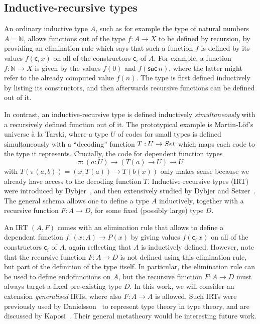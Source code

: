 \documentclass[a4paper,UKenglish,numberwithinsect,cleveref,thm-restate]{lipics-v2021}
\begin{document}
\subsection{Inductive-recursive types}

An ordinary inductive type $A$, such as for example the type of natural numbers $A = \mathbb{N}$, allows functions out of the type $f : A \to X$ to be defined by recursion, by providing an elimination rule which says that such a function $f$ is defined by its values $f(\mathsf{c}_i\,x)$ on all of the constructors $\mathsf{c}_i$ of $A$. For example, a function $f: \mathbb{N} \to X$ is given by the values $f(0)$ and $f(\mathsf{suc}\,n)$, where the latter might refer to the already computed value $f(n)$.
%
The type is first defined inductively by listing its constructors, and then afterwards recursive functions can be defined out of it.

In contrast, an inductive-recursive type is defined inductively \emph{simultaneously} with a recursively defined function out of it. The prototypical example is Martin-L\"of's universe \`a la Tarski, where a type $U$ of codes for small types is defined simultaneously with a ``decoding'' function $T : U \to \Set$ which maps each code to the type it represents. Crucially, the code for dependent function types
\[
  \pi : (a : U) \to (T(a) \to U) \to U
\]
with $T(\pi(a, b)) = (x : T(a)) \to T(b(x))$ only makes sense because we already have access to the decoding function $T$.
%
Inductive-recursive types (IRT) were introduced by Dybjer~\cite{Dybjer2000}, and then extensively studied by Dybjer and Setzer~\cite{Dybjer1999,Dybjer2003}.
The general schema allows one to define a type $A$ inductively, together with a recursive function $F : A \to D$, for some fixed (possibly large) type $D$.

An IRT $(A, F)$ comes with an elimination rule that allows to define a dependent function  $f : (x : A) \to P(x)$ by giving values $f(\mathsf{c}_i\,x)$ on all of the constructors $\mathsf{c}_i$ of $A$, again reflecting that $A$ is inductively defined.
%
However, note that the recursive function $F : A \to D$ is not defined using this elimination rule, but part of the definition of the type itself.
%
In particular, the elimination rule can be used to define endofunctions on $A$, but the recursive function  $F : A \to D$ must always target a fixed pre-existing type $D$.
%
In this work, we will consider an extension \emph{generalised} IRTs, where also $F : A \to A$ is allowed.
%
Such IRTs were previously used by Danielsson~\cite{Danielsson2006} to represent type theory in type theory, and are discussed by Kaposi~\cite{Kaposi2023}.
%
Their general metatheory would be interesting future work.
\end{document}
